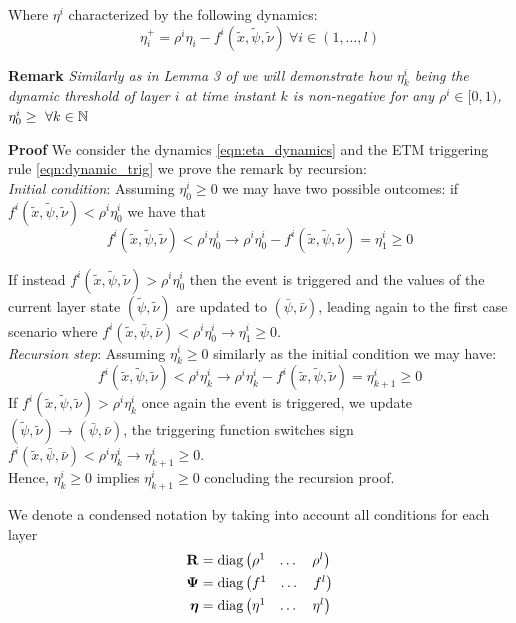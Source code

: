 \documentclass{article}
\begin{document}
Where $\eta^i$ characterized by the following dynamics:
\begin{equation}\label{eqn:eta_dynamics}
  \eta^+_i = \rho^i \eta_i - f^i(\tilde{x}, \tilde{\psi}, \tilde{\nu})\  \forall i \in \left( 1, \dots, l \right) 
\end{equation}

\textbf{Remark} \emph{Similarly as in Lemma 3 of \cite{data-driven} we will demonstrate how $\eta^i_k$ being the dynamic threshold of layer $i$ at time instant $k$ is non-negative for any $\rho^i \in [0, 1)$, $\eta^i_0 \geq\ \forall k \in {\mathbb{N}}$}

\textbf{Proof} We consider the dynamics \ref{eqn:eta_dynamics} and the ETM triggering rule \ref{eqn:dynamic_trig} we prove the remark by recursion:\\
\emph{Initial condition}: Assuming $\eta^i_0 \geq 0$ we may have two possible outcomes:
if $f^i(\tilde{x}, \tilde{\psi}, \tilde{\nu}) < \rho^i \eta^i_0$ we have that 
\begin{equation}
  f^i(\tilde{x}, \tilde{\psi}, \tilde{\nu}) < \rho^i \eta^i_0 \to \rho^i \eta^i_0 - f^i(\tilde{x}, \tilde{\psi}, \tilde{\nu}) = \eta^i_1 \geq 0
\end{equation}

If instead $f^i(\tilde{x}, \tilde{\psi}, \tilde{\nu}) > \rho^i \eta^i_0$ then the event is triggered and the values of the current layer state $(\tilde{\psi}, \tilde{\nu})$ are updated to $(\bar{\psi}, \bar{\nu})$, leading again to the first case scenario where $f^i(\tilde{x}, \bar{\psi}, \bar{\nu}) < \rho^i \eta^i_0 \to \eta^i_1 \geq 0$.\\
\emph{Recursion step}: Assuming $\eta^i_k \geq 0$ similarly as the initial condition we may have:
$$
f^i(\tilde{x}, \tilde{\psi}, \tilde{\nu}) < \rho^i \eta^i_k \to \rho^i \eta^i_k - f^i(\tilde{x}, \tilde{\psi}, \tilde{\nu}) = \eta^i_{k+1} \geq 0
$$
If $f^i(\tilde{x}, \tilde{\psi}, \tilde{\nu}) > \rho^i \eta^i_k$ once again the event is triggered, we update $(\tilde{\psi}, \tilde{\nu}) \to (\bar{\psi}, \bar{\nu})$, the triggering function switches sign $f^i(\tilde{x}, \bar{\psi}, \bar{\nu}) < \rho^i \eta^i_k \to \eta^i_{k+1} \geq 0$.\\
Hence, $\eta^i_k \geq 0$ implies $\eta^i_{k+1} \geq 0$ concluding the recursion proof.


We denote a condensed notation by taking into account all conditions for each layer
\begin{equation}
\begin{aligned}
   {\bf{R}} &= \text{diag} \left(\begin{matrix}\rho^1 & \dots & \rho^l \end{matrix}\right)\\
   \mathbf{\Psi} &= \text{diag} \left(\begin{matrix} f^1 & \dots & f^l \end{matrix}\right)\\ 
   \boldsymbol{\eta} &= \text{diag} \left(\begin{matrix} \eta^1 & \dots & \eta^l \end{matrix}\right)   
\end{aligned}
\end{equation}
\end{document}
